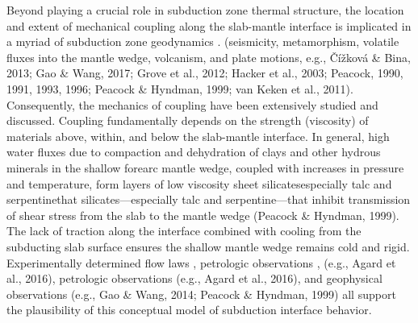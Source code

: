 \documentclass[draft,linenumbers]{agujournal2018} %
\providecommand{\DIFaddtex}[1]{{\protect\color{blue} \sf #1}} %
\providecommand{\DIFdeltex}[1]{{\protect\color{red} \scriptsize #1}} %
\providecommand{\DIFaddbegin}{} %
\providecommand{\DIFaddend}{} %
\providecommand{\DIFdelbegin}{} %
\providecommand{\DIFdelend}{} %
\providecommand{\DIFadd}[1]{\texorpdfstring{\DIFaddtex{#1}}{#1}} %
\providecommand{\DIFdel}[1]{\texorpdfstring{\DIFdeltex{#1}}{}} %
\newcommand{\DIFscaledelfig}{0.3}
\newlength{\DIFdelgraphicswidth} %
\newlength{\DIFdelgraphicsheight} %
\newcommand{\DIFaddincludegraphics}[2][]{{\color{blue}\fbox{\DIFOincludegraphics[#1]{#2}}}} %
\newcommand{\DIFdelincludegraphics}[2][]{%
\sbox{\DIFdelgraphicsbox}{\DIFOincludegraphics[#1]{#2}}%
\settoboxwidth{\DIFdelgraphicswidth}{\DIFdelgraphicsbox} %
\settoboxtotalheight{\DIFdelgraphicsheight}{\DIFdelgraphicsbox} %
\scalebox{\DIFscaledelfig}{%
\parbox[b]{\DIFdelgraphicswidth}{\usebox{\DIFdelgraphicsbox}\\[-\baselineskip] \rule{\DIFdelgraphicswidth}{0em}}\llap{\resizebox{\DIFdelgraphicswidth}{\DIFdelgraphicsheight}{%
\setlength{\unitlength}{\DIFdelgraphicswidth}%
\begin{picture}(1,1)%
\thicklines\linethickness{2pt} %
{\color[rgb]{1,0,0}\put(0,0){\framebox(1,1){}}}%
{\color[rgb]{1,0,0}\put(0,0){\line( 1,1){1}}}%
{\color[rgb]{1,0,0}\put(0,1){\line(1,-1){1}}}%
\end{picture}%
}\hspace*{3pt}}} %
} %
\DeclareRobustCommand{\DIFaddbegin}{\DIFOaddbegin \let\includegraphics\DIFaddincludegraphics} %
\DeclareRobustCommand{\DIFaddend}{\DIFOaddend \let\includegraphics\DIFOincludegraphics} %
\DeclareRobustCommand{\DIFdelbegin}{\DIFOdelbegin \let\includegraphics\DIFdelincludegraphics} %
\DeclareRobustCommand{\DIFdelend}{\DIFOaddend \let\includegraphics\DIFOincludegraphics} %
\begin{document}
Beyond playing a crucial role in subduction zone thermal structure, the
location and extent of mechanical coupling along the slab-mantle
interface is implicated in a myriad of subduction zone geodynamics
\DIFdelbegin %
\DIFdel{.}\DIFdelend \DIFaddbegin \DIFadd{(seismicity, metamorphism, volatile fluxes into the mantle wedge,
volcanism, and plate motions, e.g., Čížková \& Bina, 2013; Gao \& Wang,
2017; Grove et al., 2012; Hacker et al., 2003; Peacock, 1990, 1991,
1993, 1996; Peacock \& Hyndman, 1999; van Keken et al., 2011).
}\DIFaddend Consequently, the mechanics of coupling have been extensively studied
and discussed. Coupling fundamentally depends on the strength
(viscosity) of materials above, within, and below the slab-mantle
interface. In general, high water fluxes due to compaction and
dehydration of clays and other hydrous minerals in the shallow forearc
mantle wedge, coupled with increases in pressure and temperature, form
layers of low viscosity sheet \DIFdelbegin \DIFdel{silicates\textemdash especially talc and
serpentine\textemdash that }\DIFdelend \DIFaddbegin \DIFadd{silicates---especially talc and
serpentine---that }\DIFaddend inhibit transmission of shear stress from the slab to
the mantle wedge \DIFdelbegin %
\DIFdelend \DIFaddbegin \DIFadd{(Peacock \& Hyndman, 1999)}\DIFaddend . The lack of traction along
the interface combined with cooling from the subducting slab surface
ensures the shallow mantle wedge remains cold and rigid. Experimentally
determined flow laws \DIFdelbegin %
\DIFdel{, petrologic observations }%
\DIFdel{, }\DIFdelend \DIFaddbegin \DIFadd{(e.g., Agard et al., 2016), petrologic observations
(e.g., Agard et al., 2016), }\DIFaddend and geophysical observations \DIFdelbegin %
\DIFdelend \DIFaddbegin \DIFadd{(e.g., Gao \&
Wang, 2014; Peacock \& Hyndman, 1999) }\DIFaddend all support the plausibility of
this conceptual model of subduction interface behavior.
\end{document}

